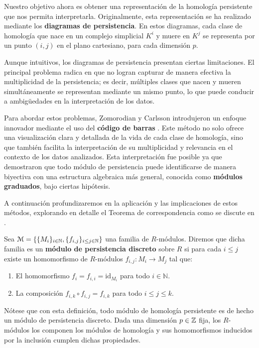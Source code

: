 Nuestro objetivo ahora es obtener una representación de la homología persistente que nos permita interpretarla. Originalmente, esta representación se ha realizado mediante los \textbf{diagramas de persistencia}. En estos diagramas, cada clase de homología que nace en un complejo simplicial \(K^{i}\) y muere en \(K^{j}\) se representa por un punto \((i, j)\) en el plano cartesiano, para cada dimensión \(p\).

Aunque intuitivos, los diagramas de persistencia presentan ciertas limitaciones. El principal problema radica en que no logran capturar de manera efectiva la multiplicidad de la persistencia; es decir, múltiples clases que nacen y mueren simultáneamente se representan mediante un mismo punto, lo que puede conducir a ambigüedades en la interpretación de los datos.

Para abordar estos problemas, Zomorodian y Carlsson introdujeron un enfoque innovador mediante el uso del \textbf{código de barras} \cite{zomorodian2004computing}. Este método no solo ofrece una visualización clara y detallada de la vida de cada clase de homología, sino que también facilita la interpretación de su multiplicidad y relevancia en el contexto de los datos analizados. Esta interpretación fue posible ya que demostraron que todo módulo de persistencia puede identificarse de manera biyectiva con una estructura algebraica más general, conocida como \textbf{módulos graduados}, bajo ciertas hipótesis.

A continuación profundizaremos en la aplicación y las implicaciones de estos métodos, explorando en detalle el Teorema de correspondencia como se discute en \cite{Corbet_2018}.

\begin{definicion}
	Sea \( \mathcal{M} = \{\{M_i\}_{i \in \mathbb{N}}, \{f_{i,j}\}_{i \leq j \in \mathbb{N}}\} \) una familia de \( R \)-módulos. Diremos que dicha familia es un \textbf{módulo de persistencia discreto} sobre \( R \) si para cada \( i \leq j \) existe un homomorfismo de \( R \)-módulos \( f_{i,j}: M_i \to M_j \) tal que:
	\begin{enumerate}
		\item El homomorfismo \( f_i = f_{i,i} = \mathrm{id}_{M_i} \) para todo \( i \in \mathbb{N} \).
		\item La composición \( f_{i,k} \circ f_{i,j} = f_{i,k} \) para todo \( i \leq j \leq k \).
	\end{enumerate}
\end{definicion}
\begin{observacion}
	Nótese que con esta definición, todo módulo de homología persistente es de hecho un módulo de persistencia discreto. Dada una dimensión $p \in \mathbb{Z}$ fija, los $R$-módulos los componen los módulos de homología y sus homomorfismos inducidos por la inclusión cumplen dichas propiedades. 
\end{observacion}

